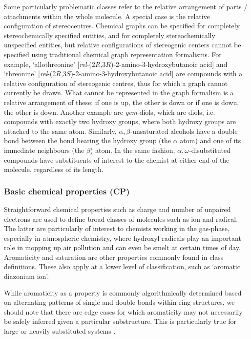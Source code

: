 \documentclass[10pt]{bmc_article}
\newenvironment{bmcformat}{\baselineskip20pt\sloppy\setboolean{publ}{false}}{\baselineskip20pt\sloppy}
\begin{document}
\begin{bmcformat}
Some particularly problematic classes refer to the relative arrangement of parts / attachments within the whole molecule. A special case is the relative configuration of stereocentres. Chemical graphs can be specified for completely stereochemically specified entities, and for completely stereochemically unspecified entities, but relative configurations of stereogenic centers cannot be specified using traditional chemical graph representation formalisms. For example, `allothreonine' [\textit{rel}-(2$R$,3$R$)-2-amino-3-hydroxybutanoic acid] and `threonine' [\textit{rel}-(2$R$,3$S$)-2-amino-3-hydroxybutanoic acid] are compounds with a relative configuration of stereogenic centres, thus for which a graph cannot currently be drawn. What cannot be represented in the graph formalism is a relative arrangement of these: if one is up, the other is down or if one is down, the other is down. Another example are 
\textit{gem}-diols, which are diols, i.e. compounds with exactly two hydroxy groups, where both hydroxy groups are attached to the same atom.  Similarly, $\alpha,\beta$-unsaturated alcohols have a double bond between the bond bearing the hydroxy group (the $\alpha$ atom) and one of its immediate neighbours (the $\beta$) atom. In the same fashion, $\alpha,\omega$-disubstituted compounds have substituents of interest to the chemist at either end of the molecule, regardless of its length.


\subsubsection*{Basic chemical properties (CP)}

Straightforward chemical properties such as charge and number of unpaired electrons are used to define broad classes of molecules such as ion and radical. The latter are particularly of interest to chemists working in the gas-phase, especially in atmospheric chemistry, where hydroxyl radicals play an important role in mopping up air pollution and can even be smelt at certain times of day. Aromaticity and saturation are other properties commonly found in class definitions. These also apply at a lower level of classification, such as `aromatic diazonium ion'.  

While aromaticity as a property is commonly algorithmically determined based on alternating patterns of single and double bonds within ring structures, we should note that there are edge cases for which aromaticity may not necessarily be safely inferred given a particular substructure. This is particularly true for large or heavily substituted systems \cite{rzepa2006}. 



\end{bmcformat}
\end{document}
